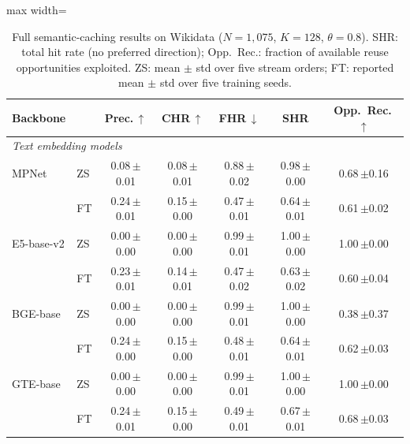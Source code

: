 \begin{table}[p]
\centering
\caption{Full semantic-caching results on Wikidata ($N=1{,}075$, $K=128$, $\theta=0.8$). SHR: total hit rate (no preferred direction); Opp.\ Rec.: fraction of available reuse opportunities exploited. ZS: mean $\pm$ std over five stream orders; FT: reported mean $\pm$ std over five training seeds.
}
\label{tab:app-caching-wd}
\footnotesize
\setlength{\tabcolsep}{5pt}
\renewcommand{\arraystretch}{1.1}
\begin{adjustbox}{max width=\textwidth}
\begin{tabular}{ll ccccc}
\toprule
Backbone & & Prec.\,$\uparrow$ & CHR\,$\uparrow$ & FHR\,$\downarrow$ & SHR & Opp.\ Rec.\,$\uparrow$\\
\midrule
\multicolumn{7}{l}{\textit{Text embedding models}}\\
MPNet & ZS & 0.08\,{\scriptsize$\pm$0.01} & 0.08\,{\scriptsize$\pm$0.01} & 0.88\,{\scriptsize$\pm$0.02} & 0.98\,{\scriptsize$\pm$0.00} & 0.68\,{\scriptsize$\pm$0.16}\\
 & FT & 0.24\,{\scriptsize$\pm$0.01} & 0.15\,{\scriptsize$\pm$0.00} & 0.47\,{\scriptsize$\pm$0.01} & 0.64\,{\scriptsize$\pm$0.01} & 0.61\,{\scriptsize$\pm$0.02}\\
E5-base-v2 & ZS & 0.00\,{\scriptsize$\pm$0.00} & 0.00\,{\scriptsize$\pm$0.00} & 0.99\,{\scriptsize$\pm$0.01} & 1.00\,{\scriptsize$\pm$0.00} & 1.00\,{\scriptsize$\pm$0.00}\\
 & FT & 0.23\,{\scriptsize$\pm$0.01} & 0.14\,{\scriptsize$\pm$0.01} & 0.47\,{\scriptsize$\pm$0.02} & 0.63\,{\scriptsize$\pm$0.02} & 0.60\,{\scriptsize$\pm$0.04}\\
BGE-base & ZS & 0.00\,{\scriptsize$\pm$0.00} & 0.00\,{\scriptsize$\pm$0.00} & 0.99\,{\scriptsize$\pm$0.01} & 1.00\,{\scriptsize$\pm$0.00} & 0.38\,{\scriptsize$\pm$0.37}\\
 & FT & 0.24\,{\scriptsize$\pm$0.00} & 0.15\,{\scriptsize$\pm$0.00} & 0.48\,{\scriptsize$\pm$0.01} & 0.64\,{\scriptsize$\pm$0.01} & 0.62\,{\scriptsize$\pm$0.03}\\
GTE-base & ZS & 0.00\,{\scriptsize$\pm$0.00} & 0.00\,{\scriptsize$\pm$0.00} & 0.99\,{\scriptsize$\pm$0.01} & 1.00\,{\scriptsize$\pm$0.00} & 1.00\,{\scriptsize$\pm$0.00}\\
 & FT & 0.24\,{\scriptsize$\pm$0.01} & 0.15\,{\scriptsize$\pm$0.00} & 0.49\,{\scriptsize$\pm$0.01} & 0.67\,{\scriptsize$\pm$0.01} & 0.68\,{\scriptsize$\pm$0.03}\\

\end{tabular}
\end{adjustbox}
\end{table}
